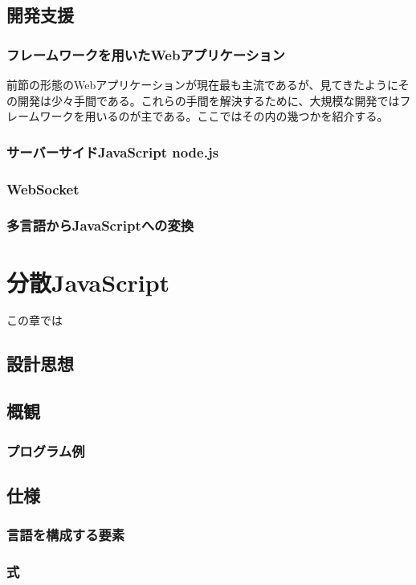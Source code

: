 \documentclass[a4j,12pt]{jreport}
\begin{document}
\section{開発支援}
\subsection{フレームワークを用いたWebアプリケーション}
前節の形態のWebアプリケーションが現在最も主流であるが、見てきたようにその開発は少々手間である。これらの手間を解決するために、大規模な開発ではフレームワークを用いるのが主である。ここではその内の幾つかを紹介する。

\subsection{サーバーサイドJavaScript node.js}
\subsection{WebSocket}
\subsection{多言語からJavaScriptへの変換}


\chapter{分散JavaScript}
この章では
\section{設計思想}
\section{概観}
\subsection{プログラム例}
\section{仕様}
\subsection{言語を構成する要素}
\subsection{式}
\end{document}
